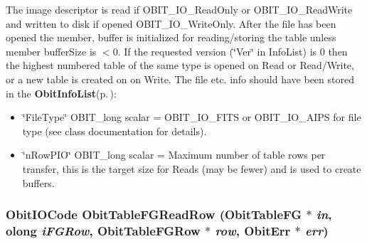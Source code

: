 The image descriptor is read if OBIT\_\-IO\_\-Read\-Only or OBIT\_\-IO\_\-Read\-Write and written to disk if opened OBIT\_\-IO\_\-Write\-Only. After the file has been opened the member, buffer is initialized for reading/storing the table unless member buffer\-Size is $<$0. If the requested version (\char`\"{}Ver\char`\"{} in Info\-List) is 0 then the highest numbered table of the same type is opened on Read or Read/Write, or a new table is created on on Write. The file etc. info should have been stored in the {\bf Obit\-Info\-List}{\rm (p.\,\pageref{structObitInfoList})}: \begin{itemize}
\item \char`\"{}File\-Type\char`\"{} OBIT\_\-long scalar = OBIT\_\-IO\_\-FITS or OBIT\_\-IO\_\-AIPS for file type (see class documentation for details). \item \char`\"{}n\-Row\-PIO\char`\"{} OBIT\_\-long scalar = Maximum number of table rows per transfer, this is the target size for Reads (may be fewer) and is used to create buffers. 
\end{itemize}
\subsubsection{\setlength{\rightskip}{0pt plus 5cm}Obit\-IOCode Obit\-Table\-FGRead\-Row ({\bf Obit\-Table\-FG} $\ast$ {\em in}, {\bf olong} {\em i\-FGRow}, {\bf Obit\-Table\-FGRow} $\ast$ {\em row}, {\bf Obit\-Err} $\ast$ {\em err})}\label{ObitTableFG_8h_a18}


